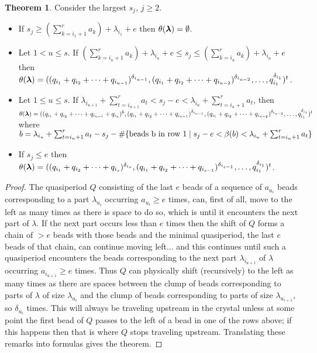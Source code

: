 \documentclass[12pt]{amsart}
\numberwithin{equation}{section}
\theoremstyle{definition}
\newtheorem{theorem}[equation]{Theorem}
\newcommand{\emp}{\emptyset}
\begin{document}
\begin{theorem}\label{firstcompdepth}Consider the largest $s_j$, $j\geq 2$.\begin{itemize}
\item  If $s_j\geq(\sum_{k=i_1+1}^r a_k)+\lambda_{i_1}+e$ then $\theta(\bla)=\emp$.
\item Let $1< u \leq s$. If $(\sum_{k=i_u+1}^r a_k)+\lambda_{i_u}+e\leq s_j \leq (\sum_{k=i_u}^r a_k)+\lambda_{i_u}+e$ then\\ $\theta(\boldsymbol{\lambda})=((q_{i_1}+q_{i_2}+\dots+q_{i_{u-1}})^{\delta_{i_{u-1}}},(q_{i_1}+q_{i_2}+\dots+q_{i_{u-2}})^{\delta_{i_{u-2}}},\dots, q_{i_1}^{\delta_{i_1}})^t$. 
\item Let $1\leq u\leq s$. If $\lambda_{i_{u+1}}+\sum_{t=i_{u+1}}^r a_t < s_j-e < \lambda_{i_u}+\sum_{t=i_u+1}^ra_t$, 
then\\
$\theta(\boldsymbol{\lambda})=((q_{i_1}+q_{i_2}+\dots+q_{i_{u-1}}+q_{i_u})^b,(q_{i_1}+q_{i_2}+\dots+q_{i_{u-1}})^{\delta_{i_{u-1}}},(q_{i_1}+q_{i_2}+\dots+q_{i_{u-2}})^{\delta_{i_{u-2}}},
\dots, q_{i_1}^{\delta_{i_1}})^t$
where $b=\lambda_{i_u}+\sum_{t=i_u+1}^ra_t-s_j-\#\{\hbox{beads b in row }1\mid s_j-e<\beta(b)<\lambda_{i_u}+\sum_{t=i_u+1}^ra_t\}$
\item If $s_j\leq e$ then $\theta(\boldsymbol{\lambda})=((q_{i_1}+q_{i_2}+\dots+q_{i_s})^{\delta_{i_s}},(q_{i_1}+q_{i_2}+\dots+q_{i_{s-1}})^{\delta_{i_{s-1}}},\dots, q_{i_1}^{\delta_{i_1}})^t$.
\end{itemize}
\end{theorem}

\begin{proof}
The quasiperiod $Q$ consisting of the last $e$ beads of a sequence of $a_{u_i}$ beads corresponding to a part $\lambda_{u_i}$ occurring $a_{u_i}\geq e$ times, can, first of all, move to the left as many times as there is space to do so, which is until it encounters the next part of $\lambda$.  If the next part occurs less than $e$ times then the shift of $Q$ forms a chain of $>e$ beads with those beads and the minimal quasiperiod, the last $e$ beads of that chain, can continue moving left... and this continues until such a quasiperiod encounters the beads corresponding to the next part $\lambda_{i_{u+1}}$ of $\lambda$ occurring $a_{i_{u+1}}\geq e$ times. Thus $Q$ can physically shift (recursively) to the left as many times as there are spaces between the clump of beads corresponding to parts of $\lambda$ of size $\lambda_{u_i}$ and the clump of beads corresponding to parts of size $\lambda_{u_{i+1}}$, so $\delta_{u_i}$ times. This will always be traveling upstream in the crystal unless at some point the first bead of $Q$ passes to the left of a bead in one of the rows above; if this happens then that is where $Q$ stops traveling upstream. Translating these remarks into formulas gives the theorem.
\end{proof}
\end{document}
